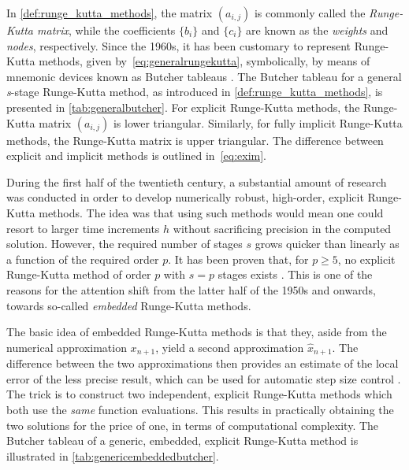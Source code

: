 In \cref{def:runge_kutta_methods}, the matrix $(a_{i,j})$ is commonly called
the \emph{Runge-Kutta matrix}, while the coefficients $\{b_{i}\}$ and
$\{c_{i}\}$ are known as the \emph{weights} and \emph{nodes}, respectively.
Since the 1960s, it has been customary to represent Runge-Kutta methods, given
by~\cref{eq:generalrungekutta}, symbolically, by means of mnemonic devices known
as Butcher tableaus \parencite[p.134]{hairer1993solving}. The Butcher tableau
for a general \emph{s}-stage Runge-Kutta method, as introduced in
\cref{def:runge_kutta_methods}, is presented in \cref{tab:generalbutcher}.
For explicit Runge-Kutta methods, the Runge-Kutta matrix $(a_{i,j})$ is lower
triangular. Similarly, for fully implicit Runge-Kutta methods, the Runge-Kutta
matrix is upper triangular. The difference between explicit and implicit
methods is outlined in~\cref{eq:exim}.



During the first half of the twentieth century, a substantial amount of research
was conducted in order to develop numerically robust, high-order, explicit
Runge-Kutta methods. The idea was that using such methods would mean one could
resort to larger time increments $h$ without sacrificing precision in the
computed solution. However, the required number of stages $s$ grows quicker than
linearly as a function of the required order $p$. It has been proven that, for
$p\geq5$, no explicit Runge-Kutta method of order $p$ with $s=p$ stages exists
\parencite[p.173]{hairer1993solving}. This is one of the reasons for the
attention shift from the latter half of the 1950s and onwards, towards so-called
\emph{embedded} Runge-Kutta methods.

The basic idea of embedded Runge-Kutta methods is that they, aside from the
numerical approximation $x_{n+1}$, yield a second approximation
$\widehat{x}_{n+1}$. The difference between the two approximations then
provides an estimate of the local error of the less precise result, which can
be used for automatic step size control
\parencite[pp.167--168]{hairer1993solving}. The trick is to construct two
independent, explicit Runge-Kutta methods which both use the \emph{same}
function evaluations. This results in practically obtaining the two solutions
for the price of one, in terms of computational complexity. The Butcher tableau
of a generic, embedded, explicit Runge-Kutta method is illustrated in
\cref{tab:genericembeddedbutcher}.

